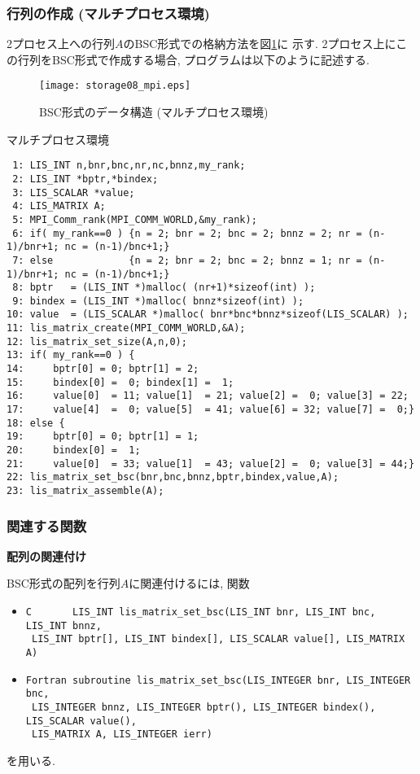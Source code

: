 \documentclass[a4paper]{jarticle}
\begin{document}
{{\subsubsection{行列の作成 (マルチプロセス環境)}
2プロセス上への行列$A$のBSC形式での格納方法を図\ref{fig:storage08_mpi}に
示す. 
2プロセス上にこの行列をBSC形式で作成する場合, プログラムは以下のように記述する. 
\begin{figure}[h]
{\centering 
\texttt{[image: storage08\_mpi.eps]} 
\caption{BSC形式のデータ構造 (マルチプロセス環境)}\label{fig:storage08_mpi}}
\end{figure}
\begin{itembox}[l]{マルチプロセス環境}
\small
\begin{verbatim}
 1: LIS_INT n,bnr,bnc,nr,nc,bnnz,my_rank;
 2: LIS_INT *bptr,*bindex;
 3: LIS_SCALAR *value;
 4: LIS_MATRIX A;
 5: MPI_Comm_rank(MPI_COMM_WORLD,&my_rank);
 6: if( my_rank==0 ) {n = 2; bnr = 2; bnc = 2; bnnz = 2; nr = (n-1)/bnr+1; nc = (n-1)/bnc+1;}
 7: else             {n = 2; bnr = 2; bnc = 2; bnnz = 1; nr = (n-1)/bnr+1; nc = (n-1)/bnc+1;}
 8: bptr   = (LIS_INT *)malloc( (nr+1)*sizeof(int) );
 9: bindex = (LIS_INT *)malloc( bnnz*sizeof(int) );
10: value  = (LIS_SCALAR *)malloc( bnr*bnc*bnnz*sizeof(LIS_SCALAR) );
11: lis_matrix_create(MPI_COMM_WORLD,&A);
12: lis_matrix_set_size(A,n,0);
13: if( my_rank==0 ) {
14:     bptr[0] = 0; bptr[1] = 2;
15:     bindex[0] =  0; bindex[1] =  1;
16:     value[0]  = 11; value[1]  = 21; value[2] =  0; value[3] = 22;
17:     value[4]  =  0; value[5]  = 41; value[6] = 32; value[7] =  0;}
18: else {
19:     bptr[0] = 0; bptr[1] = 1;
20:     bindex[0] =  1;
21:     value[0]  = 33; value[1]  = 43; value[2] =  0; value[3] = 44;}
22: lis_matrix_set_bsc(bnr,bnc,bnnz,bptr,bindex,value,A);
23: lis_matrix_assemble(A);
\end{verbatim}
\end{itembox}

\subsubsection{関連する関数}
\noindent
{\bf 配列の関連付け}

BSC形式の配列を行列$A$に関連付けるには, 関数
\begin{itemize}
\item \verb|C       LIS_INT lis_matrix_set_bsc(LIS_INT bnr, LIS_INT bnc, LIS_INT bnnz,|\\
      \verb| LIS_INT bptr[], LIS_INT bindex[], LIS_SCALAR value[], LIS_MATRIX A)|
\item \verb|Fortran subroutine lis_matrix_set_bsc(LIS_INTEGER bnr, LIS_INTEGER bnc,|\\
      \verb| LIS_INTEGER bnnz, LIS_INTEGER bptr(), LIS_INTEGER bindex(), LIS_SCALAR value(),|\\
      \verb| LIS_MATRIX A, LIS_INTEGER ierr)|
\end{itemize}
を用いる. 

}}
\end{document}

